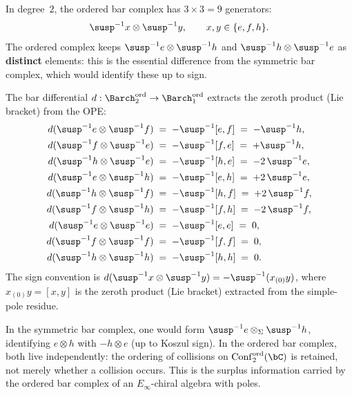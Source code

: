 \begin{computation}
\label{comp:ordered-bar-sl2}
In degree~$2$, the ordered bar complex has $3\times 3=9$ generators:
\[
\susp^{-1}x\otimes \susp^{-1}y,\qquad x,y\in\{e,f,h\}.
\]
The ordered complex keeps $\susp^{-1}e\otimes \susp^{-1}h$ and
$\susp^{-1}h\otimes \susp^{-1}e$ as \textbf{distinct} elements: this is
the essential difference from the symmetric bar complex, which would
identify these up to sign.

The bar differential $d:{\Barch}^{\mathrm{ord}}_2\to{\Barch}^{\mathrm{ord}}_1$
extracts the zeroth product (Lie bracket) from the OPE:
\begin{align}
d(\susp^{-1}e\otimes \susp^{-1}f)
&\;=\;-\susp^{-1}[e,f]\;=\;-\susp^{-1}h,
\label{eq:d-ef}\\
d(\susp^{-1}f\otimes \susp^{-1}e)
&\;=\;-\susp^{-1}[f,e]\;=\;+\susp^{-1}h,
\label{eq:d-fe}\\
d(\susp^{-1}h\otimes \susp^{-1}e)
&\;=\;-\susp^{-1}[h,e]\;=\;-2\,\susp^{-1}e,
\label{eq:d-he}\\
d(\susp^{-1}e\otimes \susp^{-1}h)
&\;=\;-\susp^{-1}[e,h]\;=\;+2\,\susp^{-1}e,
\label{eq:d-eh}\\
d(\susp^{-1}h\otimes \susp^{-1}f)
&\;=\;-\susp^{-1}[h,f]\;=\;+2\,\susp^{-1}f,
\label{eq:d-hf}\\
d(\susp^{-1}f\otimes \susp^{-1}h)
&\;=\;-\susp^{-1}[f,h]\;=\;-2\,\susp^{-1}f,
\label{eq:d-fh}\\
d(\susp^{-1}e\otimes \susp^{-1}e)
&\;=\;-\susp^{-1}[e,e]\;=\;0,
\label{eq:d-ee}\\
d(\susp^{-1}f\otimes \susp^{-1}f)
&\;=\;-\susp^{-1}[f,f]\;=\;0,
\label{eq:d-ff}\\
d(\susp^{-1}h\otimes \susp^{-1}h)
&\;=\;-\susp^{-1}[h,h]\;=\;0.
\label{eq:d-hh}
\end{align}
The sign convention is $d(\susp^{-1}x\otimes \susp^{-1}y)=-\susp^{-1}(x_{(0)}y)$,
where $x_{(0)}y=[x,y]$ is the zeroth product (Lie bracket) extracted
from the simple-pole residue.
\end{computation}

\begin{remark}
\label{rem:ordered-vs-symmetric-sl2}
In the symmetric bar complex, one would form
$\susp^{-1}e\otimes_\Sigma \susp^{-1}h$, identifying $e\otimes h$ with
$-h\otimes e$ (up to Koszul sign). In the ordered bar complex, both
live independently: the ordering of collisions on
$\operatorname{Conf}_2^{\mathrm{ord}}(\bC)$ is retained, not
merely whether a collision occurs. This is the surplus
information carried by the ordered bar complex of an
$E_\infty$-chiral algebra with poles.
\end{remark}

